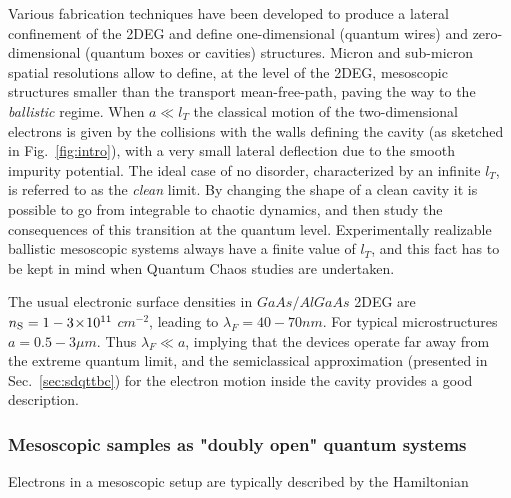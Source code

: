 \documentclass[a4paper,10pt]{article}
\newcommand{\lf}{\lambda_{\scriptscriptstyle F}}
\newcommand{\lt}{l_{\scriptscriptstyle T}}
\newcommand{\nin}{\noindent}
\begin{document}
\nin Various fabrication techniques have been developed to produce a lateral confinement of the 2DEG and define one-dimensional (quantum wires) and zero-dimensional (quantum boxes or cavities) structures. Micron and sub-micron spatial resolutions allow to define, at the level of the 2DEG, mesoscopic structures smaller than the transport mean-free-path, paving the way to the {\em ballistic} regime. When $a \ll \lt$ the classical motion of the two-dimensional electrons is given by the collisions with the walls defining the cavity (as sketched in Fig.~\ref{fig:intro}), with a very small lateral deflection due to the smooth impurity potential. The ideal case of no disorder, characterized by an infinite $\lt$, is referred to as the {\em clean} limit. By changing the shape of a clean cavity it is possible to go from integrable to chaotic dynamics, and then study the consequences of this transition at the quantum level. Experimentally realizable ballistic mesoscopic systems always have a finite value of $\lt$, and this fact has to be kept in mind when Quantum Chaos studies are undertaken. 

\nin The usual electronic surface densities in $GaAs/AlGaAs$ 2DEG are $n_{\rm S}=1-3\!\times\!10^{11}$ $cm^{-2}$, leading to $\lf = 40-70 nm$. For typical microstructures $a=0.5-3 \mu m$. Thus $\lf \ll a$, implying that the devices operate far away from the extreme quantum limit, and the semiclassical approximation (presented in Sec.~\ref{sec:sdqttbc}) for the electron motion inside the cavity provides a good description.  

\subsubsection{Mesoscopic samples as "doubly open" quantum systems}

Electrons in a mesoscopic setup are typically described by the Hamiltonian
  
\end{document}
